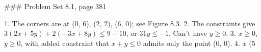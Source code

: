 ### Problem Set 8.1, page 381

1. The corners are at (0, 6), (2, 2), (6, 0); see Figure 8.3.
2. The constraints give \(3(2x+5y)+2(-3x+8y)\leq 9-10\), or \(31y\leq-1\). Can't have \(y\geq 0\).
3. \(x\geq 0\), \(y\geq 0\), with added constraint that \(x+y\leq 0\) admits only the point (0, 0).
4. \(x\) (5%

 